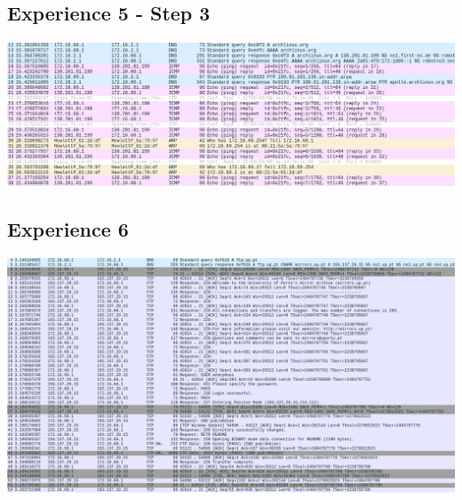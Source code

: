 \documentclass[11pt]{report}
\begin{document}
\subsection{Experience 5 - Step 3}
  \includegraphics[width=1\textwidth]{images/exp5_step3.png}
\subsection{Experience 6}
  \includegraphics[width=1\textwidth]{images/exp6.png}
\end{document}
